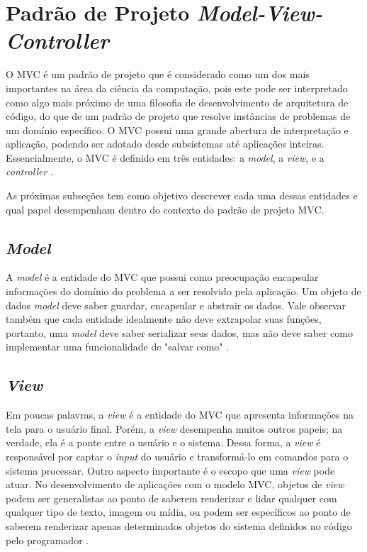 \section{Padrão de Projeto \textit{Model-View-Controller}}

O MVC é um padrão de projeto que é considerado como um dos mais importantes na área da ciência da computação, pois este pode ser interpretado como algo mais próximo de uma filosofia de desenvolvimento de arquitetura de código, do que de um padrão de projeto que resolve instâncias de problemas de um domínio específico. O MVC possui uma grande abertura de interpretação e aplicação, podendo ser adotado desde subsistemas até aplicações inteiras. Essencialmente, o MVC é definido em três entidades: a \textit{model}, a \textit{view}, e a \textit{controller} \cite{Bucanek2009}.

As próximas subseções tem como objetivo descrever cada uma dessas entidades e qual papel desempenham dentro do contexto do padrão de projeto MVC.

\subsection{\textit{Model}}

A \textit{model} é a entidade do MVC que possui como preocupação encapsular informações do domínio do problema a ser resolvido pela aplicação. Um objeto de dados \textit{model} deve saber guardar, encapsular e abstrair os dados. Vale observar também que cada entidade idealmente não deve extrapolar suas funções, portanto, uma \textit{model} deve saber serializar seus dados, mas não deve saber como implementar uma funcionalidade de "salvar como" \cite{Bucanek2009}.

\subsection{\textit{View}}

Em poucas palavras, a \textit{view} é a entidade do MVC que apresenta informações na tela para o usuário final. Porém, a \textit{view} desempenha muitos outros papeis; na verdade, ela é a ponte entre o usuário e o sistema. Dessa forma, a \textit{view} é responsável por captar o \textit{input} do usuário e transformá-lo em comandos para o sistema processar. Outro aspecto importante é o escopo que uma \textit{view} pode atuar. No desenvolvimento de aplicações com o modelo MVC, objetos de \textit{view} podem ser generalistas ao ponto de saberem renderizar e lidar qualquer com qualquer tipo de texto, imagem ou mídia, ou podem ser específicos ao ponto de saberem renderizar apenas determinados objetos do sistema definidos no código pelo programador \cite{Bucanek2009}.

